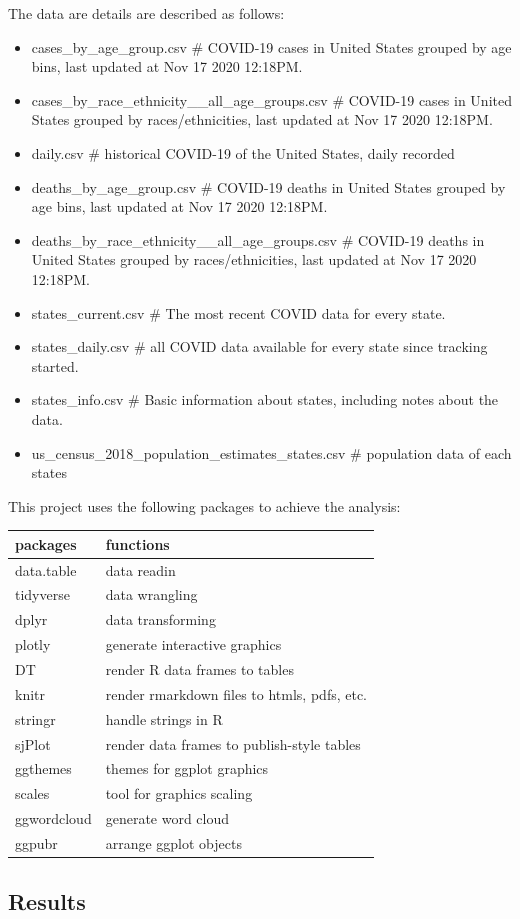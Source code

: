 \documentclass[
]{article}
\providecommand{\tightlist}{%
  \setlength{\itemsep}{0pt}\setlength{\parskip}{0pt}}
\begin{document}
The data are details are described as follows:

\begin{itemize}
\tightlist
\item
  cases\_by\_age\_group.csv \# COVID-19 cases in United States grouped
  by age bins, last updated at Nov 17 2020 12:18PM.
\item
  cases\_by\_race\_ethnicity\_\_all\_age\_groups.csv \# COVID-19 cases
  in United States grouped by races/ethnicities, last updated at Nov 17
  2020 12:18PM.
\item
  daily.csv \# historical COVID-19 of the United States, daily recorded
\item
  deaths\_by\_age\_group.csv \# COVID-19 deaths in United States grouped
  by age bins, last updated at Nov 17 2020 12:18PM.
\item
  deaths\_by\_race\_ethnicity\_\_all\_age\_groups.csv \# COVID-19 deaths
  in United States grouped by races/ethnicities, last updated at Nov 17
  2020 12:18PM.
\item
  states\_current.csv \# The most recent COVID data for every state.
\item
  states\_daily.csv \# all COVID data available for every state since
  tracking started.
\item
  states\_info.csv \# Basic information about states, including notes
  about the data.
\item
  us\_census\_2018\_population\_estimates\_states.csv \# population data
  of each states
\end{itemize}

This project uses the following packages to achieve the analysis:

\begin{longtable}[]{@{}ll@{}}
\toprule
packages & functions\tabularnewline
\midrule
\endhead
data.table & data readin\tabularnewline
tidyverse & data wrangling\tabularnewline
dplyr & data transforming\tabularnewline
plotly & generate interactive graphics\tabularnewline
DT & render R data frames to tables\tabularnewline
knitr & render rmarkdown files to htmls, pdfs, etc.\tabularnewline
stringr & handle strings in R\tabularnewline
sjPlot & render data frames to publish-style tables\tabularnewline
ggthemes & themes for ggplot graphics\tabularnewline
scales & tool for graphics scaling\tabularnewline
ggwordcloud & generate word cloud\tabularnewline
ggpubr & arrange ggplot objects\tabularnewline
\bottomrule
\end{longtable}

\hypertarget{results}{%
\subsection{Results}\label{results}}
\end{document}
